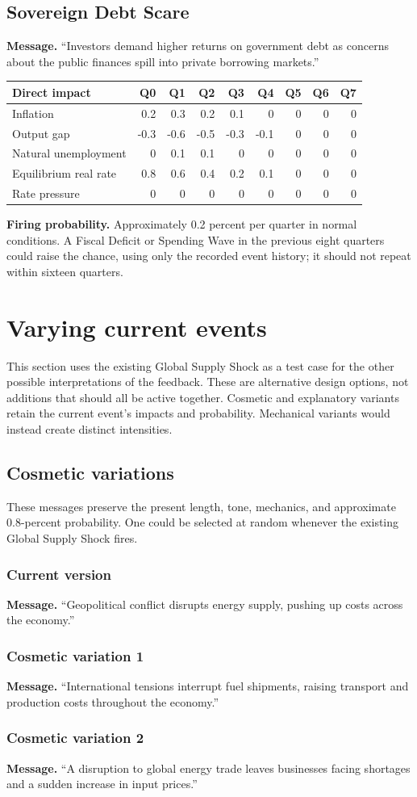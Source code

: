 \documentclass[11pt]{article}
\makeatletter
\newcommand{\event}[1]{\subsection{#1}}
\newcommand{\prob}{\textbf{Firing probability.} }
\newcommand{\eventmessage}{\textbf{Message.} }
\newcommand{\impacttable}[5]{%
\begin{center}\small
\begin{tabular}{@{}l*{8}{r}@{}}
\toprule
Direct impact & Q0 & Q1 & Q2 & Q3 & Q4 & Q5 & Q6 & Q7\\
\midrule
Inflation & #1\\
Output gap & #2\\
Natural unemployment & #3\\
Equilibrium real rate & #4\\
Rate pressure & #5\\
\bottomrule
\end{tabular}
\end{center}}
\makeatother
\begin{document}
\event{Sovereign Debt Scare }
\eventmessage ``Investors demand higher returns on government debt as concerns about the public finances spill into private borrowing markets.''
\impacttable{0.2&0.3&0.2&0.1&0&0&0&0}{-0.3&-0.6&-0.5&-0.3&-0.1&0&0&0}{0&0.1&0.1&0&0&0&0&0}{0.8&0.6&0.4&0.2&0.1&0&0&0}{0&0&0&0&0&0&0&0}
\prob Approximately 0.2 percent per quarter in normal conditions.  A Fiscal Deficit or Spending Wave in the previous eight quarters could raise the chance, using only the recorded event history; it should not repeat within sixteen quarters.

\section{Varying current events}

This section uses the existing Global Supply Shock as a test case for the other
possible interpretations of the feedback.  These are alternative design options,
not additions that should all be active together.  Cosmetic and explanatory
variants retain the current event's impacts and probability.  Mechanical variants
would instead create distinct intensities.

\subsection{Cosmetic variations}

These messages preserve the present length, tone, mechanics, and approximate
0.8-percent probability.  One could be selected at random whenever the existing
Global Supply Shock fires.



\subsubsection{Current version}
\eventmessage ``Geopolitical conflict disrupts energy supply, pushing up costs across the economy.''

\subsubsection{Cosmetic variation 1}
\eventmessage ``International tensions interrupt fuel shipments, raising transport and production costs throughout the economy.''

\subsubsection{Cosmetic variation 2}
\eventmessage ``A disruption to global energy trade leaves businesses facing shortages and a sudden increase in input prices.''
\end{document}
